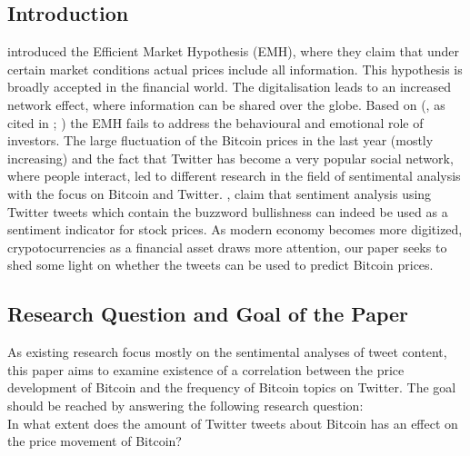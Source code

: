 \documentclass[a4paper,american,12pt]{article}
\begin{document}
\begin{spacing}{1.2}
\cleardoublepage{}
\section{Introduction}
\label{sec:intro}

\textcite[p.~388]{malkiel1970efficient} introduced the Efficient Market Hypothesis (EMH), where they claim that under certain market conditions actual prices include all information. This hypothesis is broadly accepted in the financial world. The digitalisation leads to an increased network effect, where information can be shared over the globe. Based on \citeauthor{mao2015quantifying} (\citeyear[][p.~3]{mao2015quantifying}, as cited in \cite[][pp.~175--195]{shiller2015irrational}; \cite[][pp.~279]{kahneman2013prospect}) the EMH fails to address the behavioural and emotional role of investors. The large fluctuation of the Bitcoin prices in the last year (mostly increasing) and the fact that Twitter has become a very popular social network, where people interact, led to different research in the field of sentimental analysis with the focus on Bitcoin and Twitter. \textcite[p.~18]{mao2015quantifying}, claim that sentiment analysis using Twitter tweets which contain the buzzword bullishness can indeed be used as a sentiment indicator for stock prices. As modern economy becomes more digitized, crypotocurrencies as a financial asset draws more attention, our paper seeks to shed some light on whether the tweets can be used to predict Bitcoin prices.

\subsection{Research Question and Goal of the Paper}
\label{sec:ResearchQandGoal}

As existing research focus mostly on the sentimental analyses of tweet content, this paper aims to examine existence of a correlation between the price development of Bitcoin and the frequency of Bitcoin topics on Twitter. The goal should be reached by answering the following research question: \\
In what extent does the amount of Twitter tweets about Bitcoin has an effect on the price movement of Bitcoin?


\end{spacing}
\end{document}
